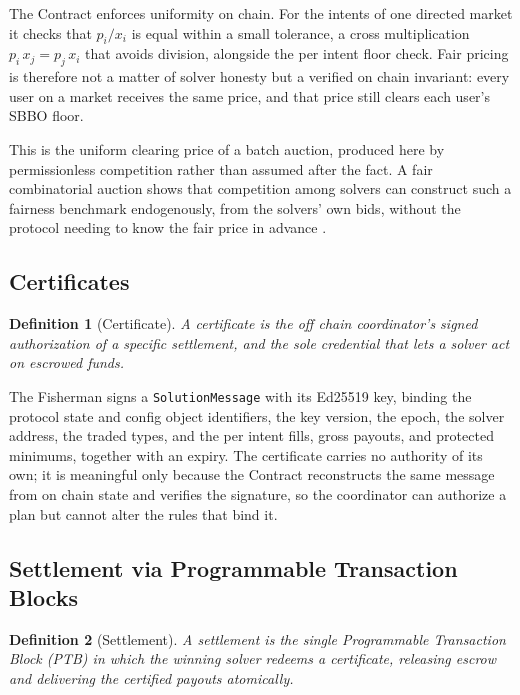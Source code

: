 \documentclass[10pt,sigconf,nonacm]{acmart}
\theoremstyle{reiythm}
\newtheorem{definition}{Definition}
\begin{document}
The Contract enforces uniformity on chain. For the intents of one directed market it
checks that $p_i / x_i$ is equal within a small tolerance, a cross multiplication
$p_i\,x_j = p_j\,x_i$ that avoids division, alongside the per intent floor check. Fair
pricing is therefore not a matter of solver honesty but a verified on chain invariant:
every user on a market receives the same price, and that price still clears each
user's SBBO floor.

This is the uniform clearing price of a batch auction, produced here by permissionless
competition rather than assumed after the fact. A fair combinatorial auction shows that
competition among solvers can construct such a fairness benchmark endogenously, from the
solvers' own bids, without the protocol needing to know the fair price in advance
\cite{canidio2025faircombinatorialauctiona}.

\subsection{Certificates}

\begin{definition}[Certificate]
A certificate is the off chain coordinator's signed authorization of a specific
settlement, and the sole credential that lets a solver act on escrowed funds.
\end{definition}

\noindent The Fisherman signs a \texttt{SolutionMessage} with its Ed25519 key,
binding the protocol state and config object identifiers, the key version, the
epoch, the solver address, the traded types, and the per intent fills, gross
payouts, and protected minimums, together with an expiry. The certificate carries
no authority of its own; it is meaningful only because the Contract reconstructs
the same message from on chain state and verifies the signature, so the
coordinator can authorize a plan but cannot alter the rules that bind it.

\subsection{Settlement via Programmable Transaction Blocks}

\begin{definition}[Settlement]
A settlement is the single Programmable Transaction Block (PTB) in which the
winning solver redeems a certificate, releasing escrow and delivering the
certified payouts atomically.
\end{definition}
\end{document}
